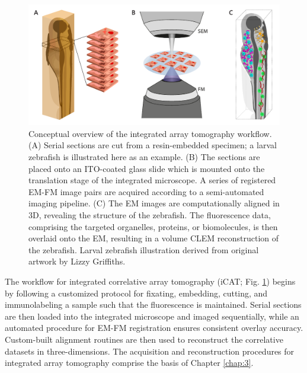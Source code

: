 \begin{figure}[!tb]
    \centering
    \includegraphics[width=\linewidth]{chapter-1/figures/fig1_iCAT_v2.pdf}
    \caption{Conceptual overview of the integrated array tomography workflow.
    (A) Serial sections are cut from a resin-embedded specimen; a larval zebrafish is illustrated here as an example.%
    (B) The sections are placed onto an ITO-coated glass slide which is mounted onto the translation stage of the integrated microscope. A series of registered EM-FM image pairs are acquired according to a semi-automated imaging pipeline.
    (C) The EM images are computationally aligned in 3D, revealing the structure of the zebrafish. The fluorescence data, comprising the targeted organelles, proteins, or biomolecules, is then overlaid onto the EM, resulting in a volume CLEM reconstruction of the zebrafish.
    Larval zebrafish illustration derived from original artwork by Lizzy Griffiths.}
    \label{fig:1.1_icat}
\end{figure}

The workflow for integrated correlative array tomography (iCAT; Fig. \ref{fig:1.1_icat}) begins by following a customized protocol for fixating, embedding, cutting, and immunolabeling a sample such that the fluorescence is maintained. Serial sections are then loaded into the integrated microscope and imaged sequentially, while an automated procedure for EM-FM registration \cite{haring2017automated} ensures consistent overlay accuracy. Custom-built alignment routines are then used to reconstruct the correlative datasets in three-dimensions. The acquisition and reconstruction procedures for integrated array tomography comprise the basis of Chapter \ref{chap:3}.

